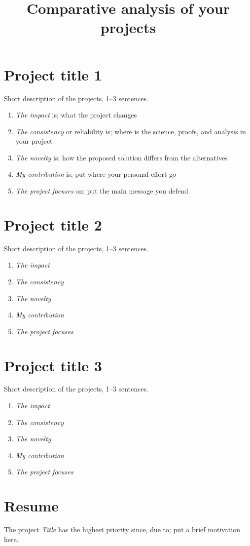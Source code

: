 \documentclass[12pt]{article}
\title{Comparative analysis of your projects}
\date{}
\begin{document}
\maketitle

\section{Project title 1}
Short description of the projects, 1--3 sentences. 
\begin{enumerate}
\item \emph{The impact} is; what the project changes 
\item \emph{The consistency} or reliability is; where is the science, proofs, and analysis in your project
\item \emph{The novelty} is; how the proposed solution differs from the alternatives
\item \emph{My contribution} is; put where your personal effort go
\item \emph{The project focuses} on; put the main message you defend
\end{enumerate}

\section{Project title 2}
Short description of the projects, 1--3 sentences. 
\begin{enumerate}
\item \emph{The impact} 
\item \emph{The consistency} 
\item \emph{The novelty} 
\item \emph{My contribution} 
\item \emph{The project focuses} 
\end{enumerate}

\section{Project title 3}
Short description of the projects, 1--3 sentences. 
\begin{enumerate}
\item \emph{The impact} 
\item \emph{The consistency} 
\item \emph{The novelty} 
\item \emph{My contribution}  
\item \emph{The project focuses}  
\end{enumerate}

\section{Resume}
The project \emph{Title} has the highest priority since, due to; put a brief motivation here. 
\end{document}
